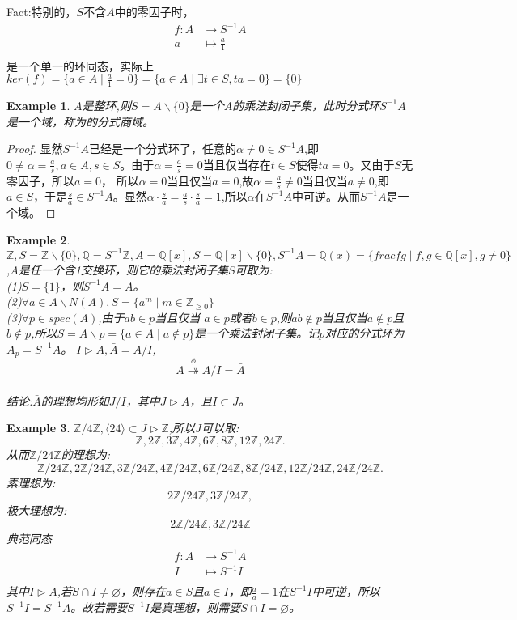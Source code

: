 \documentclass[UTF8]{article}
\newtheorem{exa}{Example}[section]
\begin{document}
Fact:特别的，$S$不含$A$中的零因子时，
\[
\begin{split}
f:A&\rightarrow S^{-1}A\\
a&\longmapsto \frac{a}{1}\\
\end{split}
\]
是一个单一的环同态，实际上$ker(f)=\{a\in A\mid\frac{a}{1}=0\}=\{a\in A\mid\exists t\in S,ta=0\}=\{0\}$

\begin{exa}
	$A$是整环,则$S=A\backslash\{0\}$是一个$A$的乘法封闭子集，此时分式环$S^{-1}A$是一个域，称为的分式商域。
\end{exa}
\begin{proof}
	显然$S^{-1}A$已经是一个分式环了，任意的$\alpha\neq0\in S^{-1}A$,即$0\neq\alpha=\frac{a}{s},a\in A,s\in S$。由于$\alpha=\frac{a}{s}=0$当且仅当存在$t\in S$使得$ta=0$。又由于$S$无零因子，所以$a=0$，
	所以$\alpha=0$当且仅当$a=0$,故$\alpha=\frac{a}{s}\neq0$当且仅当$a\neq0$,即$a\in S$，于是$\frac{s}{a}\in S^{-1}A$。显然$\alpha ·\frac{s}{a}=\frac{a}{s}·\frac{s}{a}=1$,所以$\alpha$在$S^{-1}A$中可逆。从而$S^{-1}A$是一个域。
\end{proof}

\begin{exa}
	$\mathbb Z,S=\mathbb Z\backslash\{0\},\mathbb Q=S^{-1}\mathbb Z,A=\mathbb Q[x],S=\mathbb Q[x]\backslash\{0\},S^{-1}A=\mathbb Q(x)=\{frac{f}{g}\mid f,g\in\mathbb Q[x],g\neq0\}$,$A$是任一个含1交换环，则它的乘法封闭子集$S$可取为:
	\\(1)$S=\{1\}$，则$S^{-1}A=A$。
	\\(2)$\forall a\in A\backslash N(A),S=\{a^m\mid m\in\mathbb Z_{\geq0}\}$
	\\(3)$\forall p\in spec(A)$,由于$ab\in p$当且仅当	$a\in p$或者$b\in p$,则$ab\notin p$当且仅当$a\notin p$且$b\notin p$,所以$S=A\backslash p=\{a\in A\mid a\notin p\}$是一个乘法封闭子集。记$p$对应的分式环为$A_{p}=S^{-1}A$。
	$I\triangleright A,\bar A=A/I$,$$A\stackrel{\phi}{\twoheadrightarrow}A/I=\bar A$$
	\\结论:$\bar A$的理想均形如$J/I$，其中$J\triangleright A$，且$I\subset J$。
\end{exa}

\begin{exa}
	$\mathbb Z/{4\mathbb Z,\langle 24\rangle\subset J\triangleright\mathbb Z}$,所以$J$可以取:
	$$\mathbb Z,2\mathbb Z,3\mathbb Z,4\mathbb Z,6\mathbb Z,8\mathbb Z,12\mathbb Z,24\mathbb Z.$$
	从而$\mathbb Z/{24\mathbb Z}$的理想为:
	$$\mathbb Z/{24\mathbb Z},2\mathbb Z/{24\mathbb Z},3\mathbb Z/{24\mathbb Z},4\mathbb Z/{24\mathbb Z},6\mathbb Z/{24\mathbb Z},8\mathbb Z/{24\mathbb Z},12\mathbb Z/{24\mathbb Z},24\mathbb Z/{24\mathbb Z}.$$
	素理想为:$$2\mathbb Z/{24\mathbb Z},3\mathbb Z/{24\mathbb Z},$$
	极大理想为:$$2\mathbb Z/{24\mathbb Z},3\mathbb Z/{24\mathbb Z}$$
	典范同态
	\[
	\begin{split}
	f:A&\rightarrow S^{-1}A\\
	I&\longmapsto S^{-1}I\\
	\end{split}
	\]
	其中$I\triangleright A$,若$S\cap I\neq\varnothing$，则存在$a\in S$且$a\in I$，即$\frac{a}{a}=1$在$S^{-1}I$中可逆，所以$S^{-1}I=S^{-1}A$。故若需要$S^{-1}I$是真理想，则需要$S\cap I=\varnothing$。
\end{exa}
\end{document}
